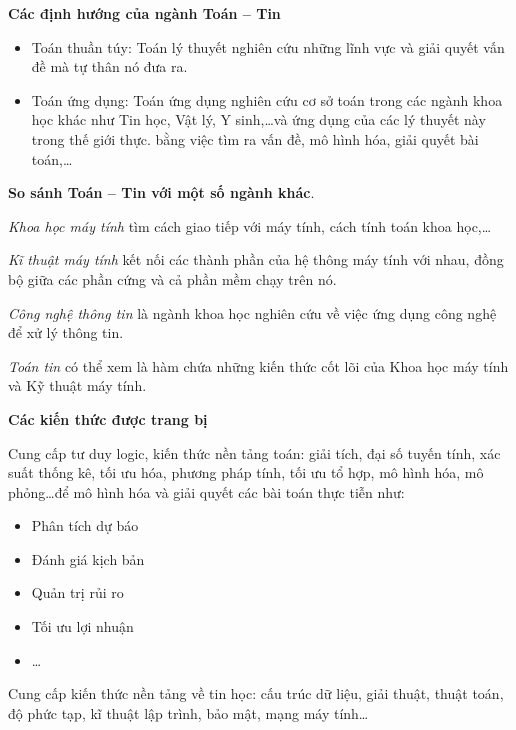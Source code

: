 \documentclass[14pt]{extarticle}
\begin{document}
\textbf{Các định hướng của ngành Toán -- Tin}
\begin{itemize}
	\item Toán thuần túy: Toán lý thuyết nghiên cứu những lĩnh vực và giải quyết vấn đề mà tự thân nó đưa ra.
	\item Toán ứng dụng: Toán ứng dụng nghiên cứu cơ sở toán trong các ngành khoa học khác như Tin học, Vật lý, Y sinh,\ldots và ứng dụng của các lý thuyết này trong thế giới thực. bằng việc tìm ra vấn đề, mô hình hóa, giải quyết bài toán,\ldots
\end{itemize}

\textbf{So sánh Toán -- Tin với một số ngành khác}.

\textit{Khoa học máy tính} tìm cách giao tiếp với máy tính, cách tính toán khoa học,\ldots

\textit{Kĩ thuật máy tính} kết nối các thành phần của hệ thông máy tính với nhau, đồng bộ giữa các phần cứng và cả phần mềm chạy trên nó.

\textit{Công nghệ thông tin} là ngành khoa học nghiên cứu về việc ứng dụng công nghệ để xử lý thông tin.

\textit{Toán tin} có thể xem là hàm chứa những kiến thức cốt lõi của Khoa học máy tính và Kỹ thuật máy tính.

\textbf{Các kiến thức được trang bị}\par
Cung cấp tư duy logic, kiến thức nền tảng toán: giải tích, đại số tuyến tính, xác suất thống kê, tối ưu hóa, phương pháp tính, tối ưu tổ hợp, mô hình hóa, mô phỏng\ldots để mô hình hóa và giải quyết các bài toán thực tiễn như:
\begin{itemize}
	\item Phân tích dự báo
	\item Đánh giá kịch bản
	\item Quản trị rủi ro
	\item Tối ưu lợi nhuận
	\item \ldots
\end{itemize}

Cung cấp kiến thức nền tảng về tin học: cấu trúc dữ liệu, giải thuật, thuật toán, độ phức tạp, kĩ thuật lập trình, bảo mật, mạng máy tính\ldots
\end{document}
